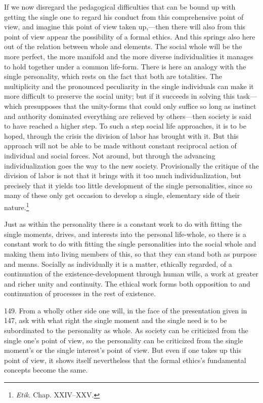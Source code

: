 \documentclass[12pt,a4paper]{book}
\newcommand{\opage}[1]{\marginnote{\footnotesize\textit{[#1]}}}
\begin{document}
If we now disregard the pedagogical difficulties that can be bound up with getting the single one to regard his
conduct from this comprehensive point of view, and imagine this point of view taken up,---then there will also
from this point of view appear the possibility of a formal ethics. And this springs also here out of the
relation between whole and elements. The social whole will be the more perfect, the more manifold and the more
diverse individualities it manages to hold together under a common life-form. There is here an analogy with the
single personality, which rests on the fact that both are totalities. The multiplicity and the pronounced
peculiarity in the single individuals can make it more difficult to preserve the social unity; but if it
succeeds in solving this task---which presupposes that the unity-forms that could only suffice so long as
instinct and authority dominated everything are relieved by others---then society is said to have reached a
higher step. To such a step social life approaches, it is to be hoped, through the crisis the division of labor
has brought with it. But this approach will not be able to be made without constant reciprocal action of
individual and social forces. Not around, but through the advancing individualization goes the way to the new
society. Provisionally the critique of the division of labor is not that it brings with it too much
individualization, but precisely that it yields too little development of the single \opage{357}personalities, since so
many of these only get occasion to develop a single, elementary side of their nature.\footnote{\emph{Etik}. Chap.
XXIV--XXV.}

Just as within the personality there is a constant work to do with fitting the single moments, drives, and
interests into the personal life-whole, so there is a constant work to do with fitting the single personalities
into the social whole and making them into living members of this, so that they can stand both as purpose and
means. Socially as individually it is a matter, ethically regarded, of a continuation of the existence-development
through human wills, a work at greater and richer unity and continuity. The ethical work forms both opposition to
and continuation of processes in the rest of existence.

149. From a wholly other side one will, in the face of the presentation given in 147, ask with what right the
single moment and the single need is to be subordinated to the personality as whole. As society can be criticized
from the single one's point of view, so the personality can be criticized from the single moment's or the single
interest's point of view. But even if one takes up this point of view, it shows itself nevertheless that the
formal ethics's fundamental concepts become the same.
\end{document}
